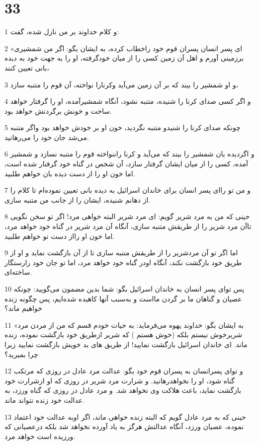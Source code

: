 \chapter{33}

\par 1 و کلام خداوند بر من نازل شده، گفت:
\par 2 «ای پسر انسان پسران قوم خود راخطاب کرده، به ایشان بگو: اگر من شمشیری برزمینی آورم و اهل آن زمین کسی را از میان خودگرفته، او را به جهت خود به دیده بانی تعیین کنند،
\par 3 و او شمشیر را بیند که بر آن زمین می‌آید وکرنارا نواخته، آن قوم را متنبه سازد،
\par 4 و اگر کسی صدای کرنا را شنیده، متنبه نشود، آنگاه شمشیرآمده، او را گرفتار خواهد ساخت و خونش برگردنش خواهد بود.
\par 5 چونکه صدای کرنا را شنیدو متنبه نگردید، خون او بر خودش خواهد بود واگر متنبه می‌شد جان خود را می‌رهانید.
\par 6 و اگردیده بان شمشیر را بیند که می‌آید و کرنا راننواخته قوم را متنبه نسازد و شمشیر آمده، کسی را از میان ایشان گرفتار سازد، آن شخص در گناه خود گرفتار شده است، اما خون او را از دست دیده بان خواهم طلبید.
\par 7 و من تو را‌ای پسر انسان برای خاندان اسرائیل به دیده بانی تعیین نموده‌ام تا کلام را از دهانم شنیده، ایشان را از جانب من متنبه سازی.
\par 8 حینی که من به مرد شریر گویم: ای مرد شریر البته خواهی مرد! اگر تو سخن نگویی تاآن مرد شریر را از طریقش متنبه سازی، آنگاه آن مرد شریر در گناه خود خواهد مرد، اما خون او رااز دست تو خواهم طلبید.
\par 9 اما اگر تو آن مردشریر را از طریقش متنبه سازی تا از آن بازگشت نماید و او از طریق خود بازگشت نکند، آنگاه اودر گناه خود خواهد مرد، اما تو جان خود رارستگار ساخته‌ای.
\par 10 پس تو‌ای پسر انسان به خاندان اسرائیل بگو: شما بدین مضمون می‌گویید: چونکه عصیان و گناهان ما بر گردن مااست و به‌سبب آنها کاهیده شده‌ایم، پس چگونه زنده خواهیم ماند؟
\par 11 «به ایشان بگو: خداوند یهوه می‌فرماید: به حیات خودم قسم که من از مردن مرد شریرخوش نیستم بلکه (خوش هستم ) که شریر ازطریق خود بازگشت نموده، زنده ماند. ای خاندان اسرائیل بازگشت نمایید! از طریق های بد خویش بازگشت نمایید زیرا چرا بمیرید؟
\par 12 و تو‌ای پسرانسان به پسران قوم خود بگو: عدالت مرد عادل در روزی که مرتکب گناه شود، او را نخواهدرهانید. و شرارت مرد شریر در روزی که او ازشرارت خود بازگشت نماید، باعث هلاکت وی نخواهد شد. و مرد عادل در روزی که گناه ورزد، به عدالت خود زنده نتواند ماند.
\par 13 حینی که به مرد عادل گویم که البته زنده خواهی ماند، اگر اوبه عدالت خود اعتماد نموده، عصیان ورزد، آنگاه عدالتش هرگز به یاد آورده نخواهد شد بلکه درعصیانی که ورزیده است خواهد مرد.
